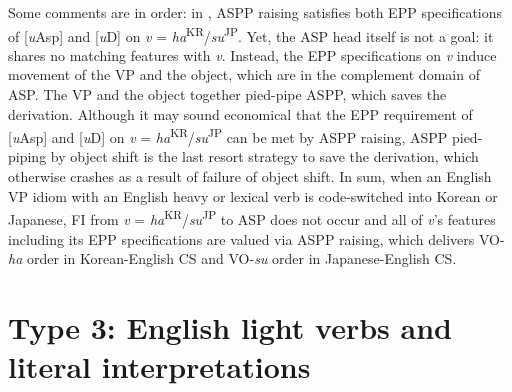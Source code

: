 \ea\label{ex:118}
\vspace*{-5mm}
\z

Some comments are in order: in , \ac{ASP}P raising satisfies both \ac{EPP} specifications of [\textit{u}Asp] and [\textit{u}D] on \textit{v} = \textit{ha}\textsuperscript{\MakeUppercase{kr}}/\textit{su}\textsuperscript{\MakeUppercase{jp}}\MakeUppercase{.} Yet, the \ac{ASP} head itself is not a goal: it shares no matching features with \textit{v}. Instead, the \ac{EPP} specifications on \textit{v} induce movement of the \acs{VP} and the object, which are in the complement domain of \ac{ASP}. The \acs{VP} and the object together pied-pipe \ac{ASP}P, which saves the derivation. Although it may sound economical that the \ac{EPP} requirement of [\textit{u}Asp] and [\textit{u}D] on \textit{v} = \textit{ha}\textsuperscript{\MakeUppercase{kr}}/\textit{su}\textsuperscript{\MakeUppercase{jp}} can be met by \ac{ASP}P raising, \ac{ASP}P pied-piping by object shift is the last resort strategy to save the derivation, which otherwise crashes as a result of failure of object shift.  
In sum, when an English \acs{VP} idiom with an English heavy or lexical verb is code-switched into Korean or Japanese, \ac{FI} from \textit{v} = \textit{ha}\textsuperscript{\MakeUppercase{kr}}/\textit{su}\textsuperscript{\MakeUppercase{jp}}\MakeUppercase{} to \ac{ASP} does not occur and all of \textit{v}’s features including its \ac{EPP} specifications are valued via \ac{ASP}P raising, which delivers \ac{VO}-\textit{ha} order in Korean-English \ac{CS} and \ac{VO}-\textit{su} order in Japanese-English \ac{CS}.

\section{Type 3: English light verbs and literal interpretations}\label{ch5:sect:5.3}

